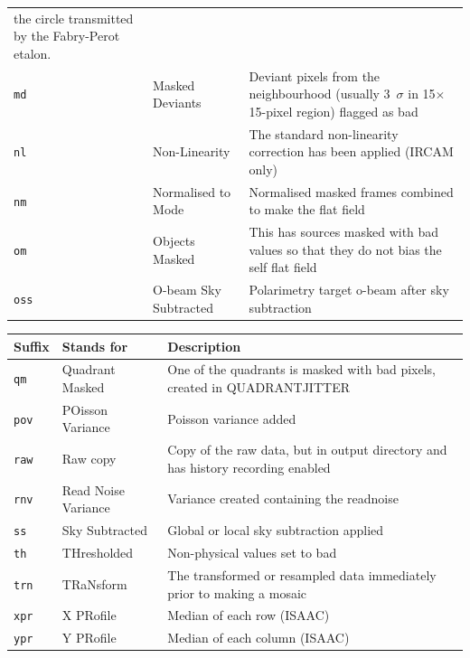 \documentclass[twoside,11pt]{article}
\renewcommand{\_}{\texttt{\symbol{95}}}
\begin{document}
\begin{tabular}{llp{81mm}}
                                 the circle transmitted by the Fabry-Perot etalon. \\
{\tt\_md}  & Masked Deviants   & Deviant pixels from the neighbourhood (usually
                                 3~$\sigma$ in 15$\times$15-pixel region) flagged as bad \\
{\tt\_nl}  & Non-Linearity     & The standard non-linearity correction has
                                 been applied (IRCAM only) \\
{\tt\_nm}  & Normalised to Mode & Normalised masked frames combined to make 
                                 the flat field \\
{\tt\_om } & Objects Masked    & This has sources masked with bad values
                                 so that they do not bias the self flat field \\
{\tt\_oss} & O-beam Sky Subtracted & Polarimetry target o-beam after sky subtraction \\
\end{tabular}

\begin{tabular}{llp{90mm}}
\hline
  Suffix   & Stands for        & Description \\ \hline
{\tt\_qm}  & Quadrant Masked   & One of the quadrants is masked with bad
                                 pixels, created in QUADRANT\_JITTER \\
{\tt\_pov} & POisson Variance  & Poisson variance added \\
{\tt\_raw} & Raw copy          & Copy of the raw data, but in output directory
                                 and has history recording enabled \\
{\tt\_rnv} & Read Noise Variance & Variance created containing the readnoise \\
{\tt\_ss}  & Sky Subtracted    & Global or local sky subtraction applied \\
{\tt\_th}  & THresholded       & Non-physical values set to bad \\
{\tt\_trn} & TRaNsform         & The transformed or resampled data immediately 
                                 prior to making a mosaic \\
{\tt\_xpr} & X PRofile         & Median of each row (ISAAC) \\
{\tt\_ypr} & Y PRofile         & Median of each column (ISAAC) \\
\end{tabular}
\end{document}
